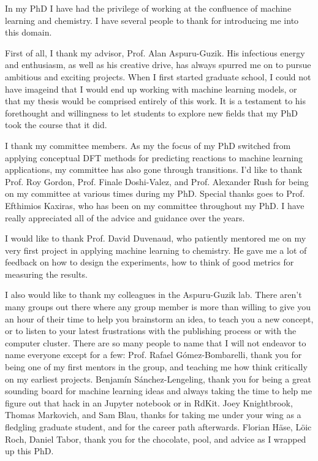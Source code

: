 In my PhD I have had the privilege of working at the confluence of machine learning and chemistry. I have several people to thank for introducing me into this domain.

First of all, I thank my advisor, Prof. Alan Aspuru-Guzik. His infectious energy and enthusiasm, as well as his creative drive, has always spurred me on to pursue ambitious and exciting projects. When I first started graduate school, I could not have imageind that I would end up working with machine learning models, or that my thesis would be comprised entirely of this work. It is a testament to his forethought and willingness to let students to explore new fields that my PhD took the course that it did.

I thank my committee members. As my the focus of my PhD switched from applying conceptual DFT methods for predicting reactions to machine learning applications, my committee has also gone through transitions. I'd like to thank Prof. Roy Gordon, Prof. Finale Doshi-Valez, and Prof. Alexander Rush for being on my committee at various times during my PhD. Special thanks goes to Prof. Efthimios Kaxiras, who has been on my committee throughout my PhD. I have really appreciated all of the advice and guidance over the years.

I would like to thank Prof. David Duvenaud, who patiently mentored me on my very first project in applying machine learning to chemistry. He gave me a lot of feedback on how to design the experiments, how to think of good metrics for measuring the results.

I also would like to thank my colleagues in the Aspuru-Guzik lab.
There aren't many groups out there where any group member is more than willing to give you an hour of their time to help you brainstorm an idea, to teach you a new concept, or to listen to your latest frustrations with the publishing process or with the computer cluster.
There are so many people to name that I will not endeavor to name everyone except for a few:
Prof. Rafael G\'omez-Bombarelli, thank you for being one of my first mentors in the group, and teaching me how think critically on my earliest projects.
Benjam\'in S\'anchez-Lengeling, thank you for being a great sounding board for machine learning ideas and always taking the time to help me figure out that hack in an Jupyter notebook or in RdKit. Joey Knightbrook, Thomas Markovich, and Sam Blau, thanks for taking me under your wing as a fledgling graduate student, and for the career path afterwards. Florian H{\"a}se, L{\"o}ic Roch, Daniel Tabor,
 thank you for the chocolate, pool, and advice as I wrapped up this PhD.

